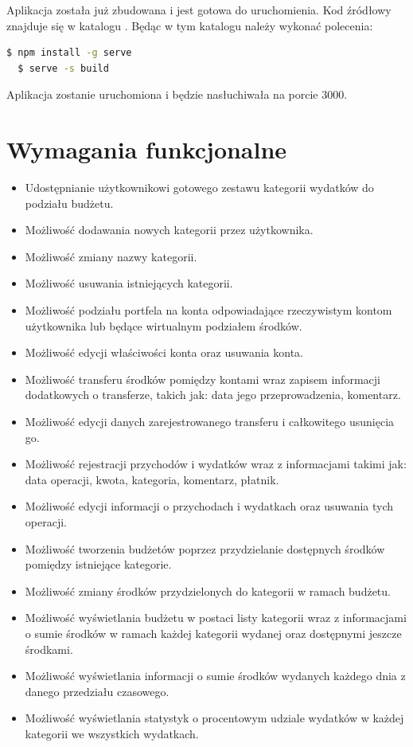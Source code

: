 \documentclass[shortabstract,inz]{iithesis}
\begin{document}
Aplikacja została już zbudowana i jest gotowa do uruchomienia. Kod źródłowy znajduje się w katalogu .
\noindend  Będąc w tym katalogu należy wykonać polecenia:
\begin{lstlisting}[language=bash]
  $ npm install -g serve
  $ serve -s build
\end{lstlisting}
Aplikacja zostanie uruchomiona i będzie nasłuchiwała na porcie 3000.

\section{Wymagania funkcjonalne}
\begin{itemize}
	\item Udostępnianie użytkownikowi gotowego zestawu kategorii wydatków do podziału budżetu.
	\item Możliwość dodawania nowych kategorii przez użytkownika.
	\item Możliwość zmiany nazwy kategorii.
	\item Możliwość usuwania istniejących kategorii.
	\item Możliwość podziału portfela na konta odpowiadające rzeczywistym kontom użytkownika lub będące wirtualnym podziałem środków.
	\item Możliwość edycji właściwości konta oraz usuwania konta.
	\item Możliwość transferu środków pomiędzy kontami wraz zapisem informacji dodatkowych o transferze, takich jak: data jego przeprowadzenia, komentarz.
	\item Możliwość edycji danych zarejestrowanego transferu i całkowitego usunięcia go.
	\item Możliwość rejestracji przychodów i wydatków wraz z informacjami takimi jak: data operacji, kwota, kategoria, komentarz, płatnik.
	\item Możliwość edycji informacji o przychodach i wydatkach oraz usuwania tych operacji.
	\item Możliwość tworzenia budżetów poprzez przydzielanie dostępnych środków pomiędzy istniejące kategorie.
	\item Możliwość zmiany środków przydzielonych do kategorii w ramach budżetu.
	\item Możliwość wyświetlania budżetu w postaci listy kategorii wraz z informacjami o sumie środków w ramach każdej kategorii wydanej oraz dostępnymi jeszcze środkami.
	\item Możliwość wyświetlania informacji o sumie środków wydanych każdego dnia z danego przedziału czasowego.
	\item Możliwość wyświetlania statystyk o procentowym udziale wydatków w każdej kategorii we wszystkich wydatkach.
\end{itemize}
\end{document}
